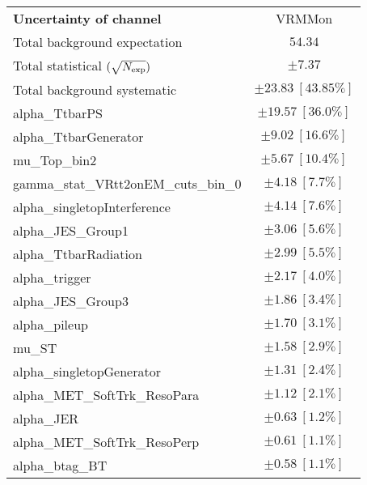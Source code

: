 
\begin{table}
\begin{center}
\setlength{\tabcolsep}{0.0pc}
\begin{tabular*}{\textwidth}{@{\extracolsep{\fill}}lc}
\noalign{\smallskip}\hline\noalign{\smallskip}
{\bf Uncertainty of channel}                                    & VRMMon         \\
\noalign{\smallskip}\hline\noalign{\smallskip}
Total background expectation             &  $54.34$       \\
\noalign{\smallskip}\hline\noalign{\smallskip}
Total statistical $(\sqrt{N_{\rm exp}})$              & $\pm 7.37$       \\
Total background systematic               & $\pm 23.83\ [43.85\%] $             \\
\noalign{\smallskip}\hline\noalign{\smallskip}
\noalign{\smallskip}\hline\noalign{\smallskip}
alpha\_TtbarPS         & $\pm 19.57\ [36.0\%] $       \\
alpha\_TtbarGenerator         & $\pm 9.02\ [16.6\%] $       \\
mu\_Top\_bin2         & $\pm 5.67\ [10.4\%] $       \\
gamma\_stat\_VRtt2onEM\_cuts\_bin\_0         & $\pm 4.18\ [7.7\%] $       \\
alpha\_singletopInterference         & $\pm 4.14\ [7.6\%] $       \\
alpha\_JES\_Group1         & $\pm 3.06\ [5.6\%] $       \\
alpha\_TtbarRadiation         & $\pm 2.99\ [5.5\%] $       \\
alpha\_trigger         & $\pm 2.17\ [4.0\%] $       \\
alpha\_JES\_Group3         & $\pm 1.86\ [3.4\%] $       \\
alpha\_pileup         & $\pm 1.70\ [3.1\%] $       \\
mu\_ST         & $\pm 1.58\ [2.9\%] $       \\
alpha\_singletopGenerator         & $\pm 1.31\ [2.4\%] $       \\
alpha\_MET\_SoftTrk\_ResoPara         & $\pm 1.12\ [2.1\%] $       \\
alpha\_JER         & $\pm 0.63\ [1.2\%] $       \\
alpha\_MET\_SoftTrk\_ResoPerp         & $\pm 0.61\ [1.1\%] $       \\
alpha\_btag\_BT         & $\pm 0.58\ [1.1\%] $       \\

\end{tabular*}
\end{center}
\end{table}
